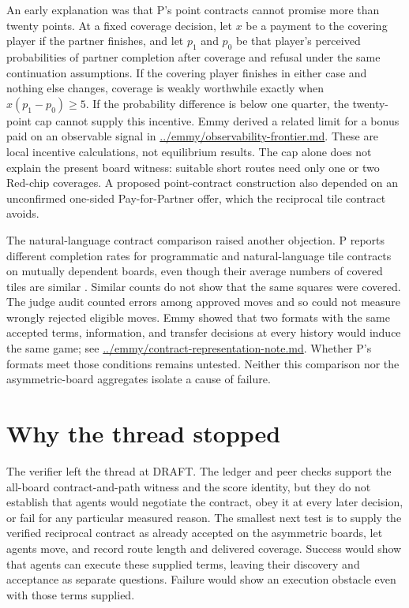\documentclass{article}
\begin{document}
An early explanation was that P's point contracts cannot promise more than twenty points. At a fixed
coverage decision, let \(x\) be a payment to the covering player if the partner finishes, and let
\(p_1\) and \(p_0\) be that player's perceived probabilities of partner completion after coverage
and refusal under the same continuation assumptions. If the covering player finishes in either case
and nothing else changes, coverage is weakly worthwhile exactly when \(x(p_1-p_0)\geq5\). If the
probability difference is below one quarter, the twenty-point cap cannot supply this incentive.
Emmy derived a related limit for a bonus paid on an observable signal in
\url{../emmy/observability-frontier.md}. These are local incentive calculations, not equilibrium results.
The cap alone does not explain the present board witness: suitable short routes need only one or two
Red-chip coverages. A proposed point-contract construction also depended on an unconfirmed one-sided
Pay-for-Partner offer, which the reciprocal tile contract avoids.

The natural-language contract comparison raised another objection. P reports different completion
rates for programmatic and natural-language tile contracts on mutually dependent boards, even though
their average numbers of covered tiles are similar \cite{P}. Similar counts do not show that the
same squares were covered. The judge audit counted errors among approved moves and so could not
measure wrongly rejected eligible moves. Emmy showed that two formats with the same accepted terms,
information, and transfer decisions at every history would induce the same game; see
\url{../emmy/contract-representation-note.md}. Whether P's formats meet those conditions remains
untested. Neither this comparison nor the asymmetric-board aggregates isolate a cause of failure.

\section{Why the thread stopped}

The verifier left the thread at DRAFT. The ledger and peer checks support the all-board
contract-and-path witness and the score identity, but they do not establish that agents would
negotiate the contract, obey it at every later decision, or fail for any particular measured reason.
The smallest next test is to supply the verified reciprocal contract as already accepted on the
asymmetric boards, let agents move, and record route length and delivered coverage. Success would
show that agents can execute these supplied terms, leaving their discovery and acceptance as
separate questions. Failure would show an execution obstacle even with those terms supplied.



\end{document}
